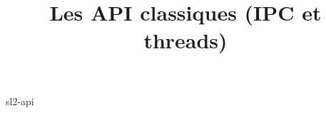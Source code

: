 \documentclass [xcolor=table] {beamer}
\title {Les API classiques (IPC et threads)}
\begin{document}
 {sl2-api}
\end{document}
